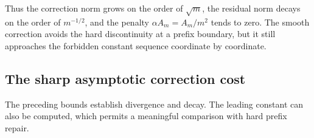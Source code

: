 Thus the correction norm grows on the order of $\sqrt m$, the residual norm decays on the order of $m^{-1/2}$, and the penalty $\alpha A_m=A_m/m^2$ tends to zero. The smooth correction avoids the hard discontinuity at a prefix boundary, but it still approaches the forbidden constant sequence coordinate by coordinate.


\subsection{The sharp asymptotic correction cost}
The preceding bounds establish divergence and decay. The leading constant can also be computed, which permits a meaningful comparison with hard prefix repair.

